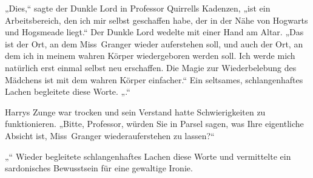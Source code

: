 „Dies,“ sagte der Dunkle Lord in Professor Quirrells Kadenzen, „ist ein Arbeitsbereich, den ich mir selbst geschaffen habe, der in der Nähe von Hogwarts und Hogsmeade liegt.“
Der Dunkle Lord wedelte mit einer Hand am Altar.
„Das ist der Ort, an dem Miss~Granger wieder auferstehen soll, und auch der Ort, an dem ich in meinem wahren Körper wiedergeboren werden soll. Ich werde mich natürlich erst einmal selbst neu erschaffen. Die Magie zur Wiederbelebung des Mädchens ist mit dem wahren Körper einfacher.“
Ein seltsames, schlangenhaftes Lachen begleitete diese Worte.
„.“

Harrys Zunge war trocken und sein Verstand hatte Schwierigkeiten zu funktionieren.
„Bitte, Professor, würden Sie in Parsel sagen, was Ihre eigentliche Absicht ist, Miss~Granger wiederauferstehen zu lassen?“

„“
Wieder begleitete schlangenhaftes Lachen diese Worte und vermittelte ein sardonisches Bewusstsein für eine gewaltige Ironie.

